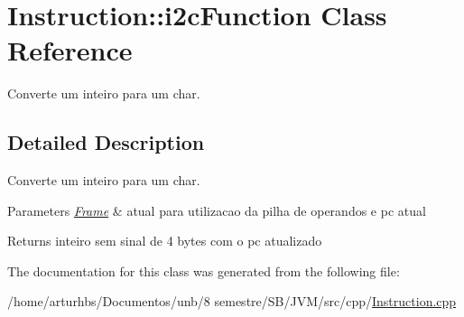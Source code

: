 \hypertarget{classInstruction_1_1i2cFunction}{}\section{Instruction\+:\+:i2c\+Function Class Reference}
\label{classInstruction_1_1i2cFunction}


Converte um inteiro para um char.  




\subsection{Detailed Description}
Converte um inteiro para um char. 


\begin{DoxyParams}{Parameters}
{\em \hyperlink{classFrame}{Frame}} & atual para utilizacao da pilha de operandos e pc atual \\
\hline
\end{DoxyParams}
\begin{DoxyReturn}{Returns}
inteiro sem sinal de 4 bytes com o pc atualizado 
\end{DoxyReturn}


The documentation for this class was generated from the following file\+:\begin{DoxyCompactItemize}
\item 
/home/arturhbs/\+Documentos/unb/8 semestre/\+S\+B/\+J\+V\+M/src/cpp/\hyperlink{Instruction_8cpp}{Instruction.\+cpp}\end{DoxyCompactItemize}
